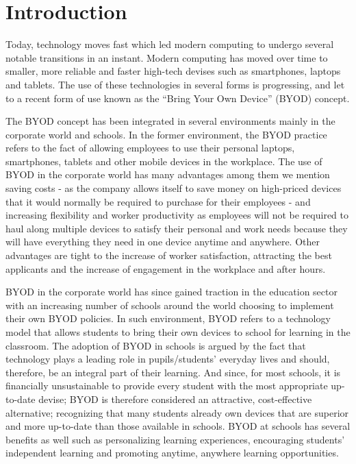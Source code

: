 \documentclass[runningheads,a4paper]{llncs}
\begin{document}
\section{Introduction}
\label{sec:intro}
Today, technology moves fast which led modern computing to undergo several notable transitions in an instant. Modern computing has moved over time to smaller, more reliable and faster high-tech devises such as smartphones, laptops and tablets. The use of these technologies in several forms is progressing, and let to a recent form of use known as the ``Bring Your Own Device'' (BYOD) concept.

The BYOD concept has been integrated in several environments mainly in the corporate world and schools. In the former environment, the BYOD practice refers to the fact of allowing employees to use their personal laptops, smartphones, tablets and other mobile devices in the workplace. The use of BYOD in the corporate world has many advantages among them we mention saving costs - as the company allows itself to save money on high-priced devices that it would normally be required to purchase for their employees - and increasing flexibility and worker productivity as employees will not be required to haul along multiple devices to satisfy their personal and work needs because they will have everything they need in one device anytime and anywhere. Other advantages are tight to the increase of worker satisfaction,  attracting the best applicants and the increase of engagement in the workplace and after hours.

BYOD in the corporate world has since gained traction in the education sector with an increasing number of schools around the world choosing to implement their own BYOD policies. In such environment, BYOD refers to a technology model that allows students to bring their own devices to school for learning in the classroom. The adoption of BYOD in schools is argued by the fact that technology plays a leading role in pupils/students' everyday lives and should, therefore, be an integral part of their learning. And since, for most schools, it is financially unsustainable to provide every student with the most appropriate up-to-date devise; BYOD is therefore considered an attractive, cost-effective alternative; recognizing that many students already own devices that are superior and more up-to-date than those available in schools. BYOD at schools has several benefits as well such as personalizing learning experiences, encouraging students' independent learning and promoting anytime, anywhere learning opportunities.
\end{document}
